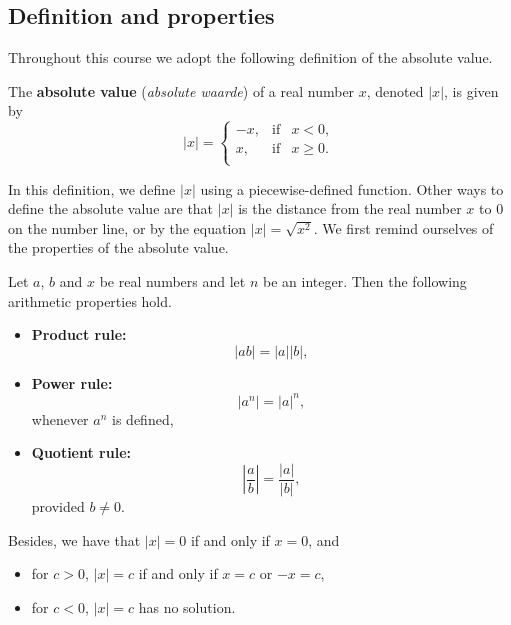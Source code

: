 \subsection{Definition and properties}
Throughout this course we adopt the following definition of the absolute value.
\begin{definition}

\label{absolutevalue}

The  \textbf{absolute value} (\textit{absolute waarde}) of a real number $x$, denoted $|x|$, is given by
\ifcalculus\vspace*{-0.5cm}\fi
\[ |x| = \left\{ \begin{array}{rcl} -x, & \mbox{if} & x < 0,  \\ x, & \mbox{if} & x \geq 0. \\ \end{array} \right.\]
\ifcalculus\vspace*{-0.5cm}\fi
\end{definition}

In this definition, we define $|x|$ using a piecewise-defined function. Other ways to define the absolute value are that $|x|$ is the distance from the real number $x$ to $0$ on the number line, or by the equation $|x| = \sqrt{x^2}$. We first remind ourselves of the properties of the absolute value.

Let $a$, $b$ and $x$ be real numbers and let $n$ be an integer.  Then the following arithmetic properties hold.
\begin{itemize}

\item \textbf{Product rule:} $$|ab|= |a||b|,$$

\item \textbf{Power rule:} $$\left| a^{n} \right| = |a|^{n},$$ whenever $a^{n}$ is defined,

\item \textbf{Quotient rule:} $$\left| \dfrac{a}{b} \right| = \dfrac{|a|}{|b|},$$ provided $b \neq 0$.

\end{itemize}

Besides, we have that $|x| = 0$ if and only if $x = 0$, and 

\begin{itemize}

\item  for $c > 0$, $|x| = c$ if and only if $x = c$ or $-x = c$,

\item  for $c < 0$, $|x| = c$ has no solution.

\end{itemize}


